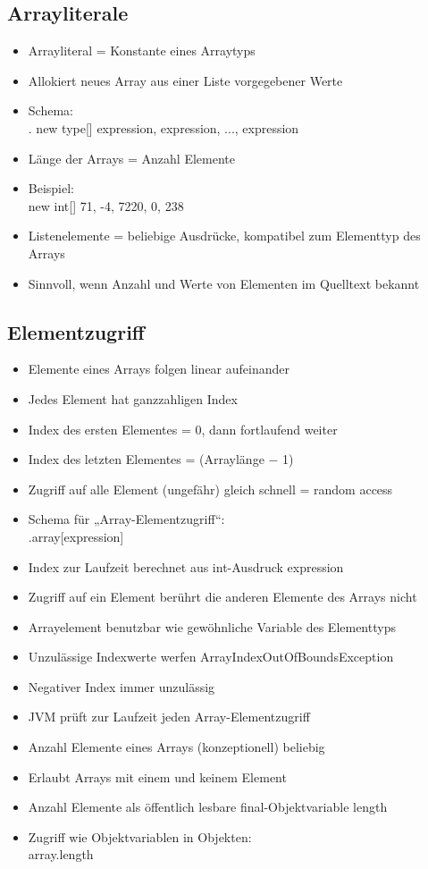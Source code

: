 \subsection{Arrayliterale}
\begin{itemize}
\item Arrayliteral = Konstante eines Arraytyps
\item Allokiert neues Array aus einer Liste vorgegebener Werte
\item Schema:\\
. \qquad new type[] {expression, expression, ..., expression}
\item Länge der Arrays = Anzahl Elemente
\item  Beispiel:\\
new int[] {71, -4, 7220, 0, 238}
\item  Listenelemente = beliebige Ausdrücke, kompatibel zum Elementtyp des Arrays
\item Sinnvoll, wenn Anzahl und Werte von Elementen im Quelltext bekannt
\end{itemize}

\subsection{Elementzugriff}
\begin{itemize}
\item Elemente eines Arrays folgen linear aufeinander
\item Jedes Element hat ganzzahligen Index
\item Index des ersten Elementes = 0, dann fortlaufend weiter
\item Index des letzten Elementes = (Arraylänge − 1)
\item Zugriff auf alle Element (ungefähr) gleich schnell = random access
\item Schema für „Array-Elementzugriff“:\\
.\qquad array[expression]
\item Index zur Laufzeit berechnet aus int-Ausdruck expression
\item Zugriff auf ein Element berührt die anderen Elemente des Arrays nicht
\item Arrayelement benutzbar wie gewöhnliche Variable des Elementtyps
\item Unzulässige Indexwerte werfen ArrayIndexOutOfBoundsException
\item Negativer Index immer unzulässig
\item JVM prüft zur Laufzeit jeden Array-Elementzugriff
\item Anzahl Elemente eines Arrays (konzeptionell) beliebig
\item Erlaubt Arrays mit einem und keinem Element
\item Anzahl Elemente als öffentlich lesbare final-Objektvariable length
\item Zugriff wie Objektvariablen in Objekten:\\
array.length

\end{itemize}

